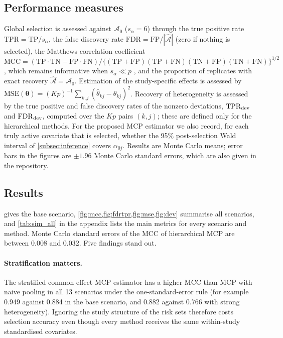 \documentclass[11pt]{article}
\theoremstyle{remark}
\numberwithin{equation}{section}
\newcommand{\btheta}{\boldsymbol{\theta}}
\begin{document}
\subsection{Performance measures}
\label{subsec:metrics}

Global selection is assessed against $\mathcal A_0$ ($s_\alpha=6$) through the
true positive rate $\mathrm{TPR}=\mathrm{TP}/s_\alpha$, the false discovery rate
$\mathrm{FDR}=\mathrm{FP}/|\hat{\mathcal A}|$ (zero if nothing is selected), the
Matthews correlation coefficient
$\mathrm{MCC}=(\mathrm{TP}\cdot\mathrm{TN}-\mathrm{FP}\cdot\mathrm{FN})/
\{(\mathrm{TP}+\mathrm{FP})(\mathrm{TP}+\mathrm{FN})(\mathrm{TN}+\mathrm{FP})(\mathrm{TN}+\mathrm{FN})\}^{1/2}$,
which remains informative when $s_\alpha\ll p$ \citep{Matthews1975, ChiccoJurman2023},
and the proportion of replicates with exact recovery $\hat{\mathcal A}=\mathcal A_0$.
Estimation of the study-specific effects is assessed by
$\mathrm{MSE}(\btheta)=(Kp)^{-1}\sum_{k,j}(\hat\theta_{kj}-\theta_{kj})^2$.
Recovery of heterogeneity is assessed by the true positive and false discovery
rates of the nonzero deviations, $\mathrm{TPR}_{\rm dev}$ and
$\mathrm{FDR}_{\rm dev}$, computed over the $Kp$ pairs $(k,j)$; these are defined
only for the hierarchical methods. For the proposed MCP estimator we also record,
for each truly active covariate that is selected, whether the 95\% post-selection
Wald interval of \cref{subsec:inference} covers $\alpha_{0j}$. Results are Monte
Carlo means; error bars in the figures are $\pm1.96$ Monte Carlo standard errors,
which are also given in the repository.

\subsection{Results}
\label{subsec:results}

 gives the base scenario, \cref{fig:mcc,fig:fdrtpr,fig:mse,fig:dev}
summarise all scenarios, and \cref{tab:sim_all} in the appendix lists the main
metrics for every scenario and method. Monte Carlo standard errors of the MCC of
hierarchical MCP are between 0.008 and 0.032. Five findings stand out.

\paragraph{Stratification matters.} The stratified common-effect MCP estimator has a
higher MCC than MCP with naive pooling in all 13 scenarios under the
one-standard-error rule (for example 0.949 against 0.884 in the base scenario, and
0.882 against 0.766 with strong heterogeneity). Ignoring the study structure of the
risk sets therefore costs selection accuracy even though every method receives the
same within-study standardised covariates.
\end{document}
